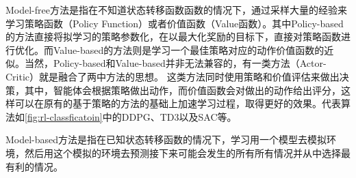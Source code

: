 Model-free方法是指在不知道状态转移函数函数的情况下，通过采样大量的经验来学习策略函数（Policy Function）或者价值函数（Value函数）。其中Policy-based的方法直接将拟学习的策略参数化，在以最大化奖励的目标下，直接对策略函数进行优化。而Value-based的方法则是学习一个最佳策略对应的动作价值函数的近似。当然，Policy-based和Value-based并非无法兼容的，有一类方法（Actor-Critic）就是融合了两中方法的思想。
这类方法同时使用策略和价值评估来做出决策，其中，智能体会根据策略做出动作，而价值函数会对做出的动作给出评分，这样可以在原有的基于策略的方法的基础上加速学习过程，取得更好的效果。代表算法如\autoref{fig:rl-classficatoin}中的DDPG\cite{lillicrap2015continuous}、TD3\cite{fujimoto2018addressing}以及SAC\cite{haarnoja2018soft}等。

Model-based方法是指在已知状态转移函数的情况下，学习用一个模型去模拟环境，然后用这个模拟的环境去预测接下来可能会发生的所有所有情况并从中选择最有利的情况。




